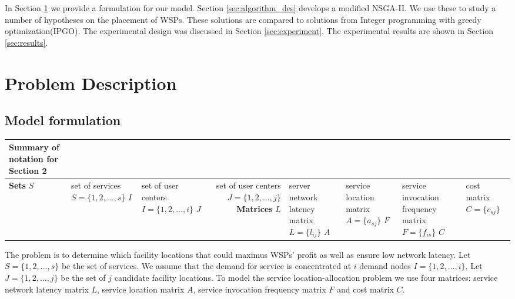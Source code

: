 \documentclass{llncs}
\begin{document}
In Section \ref{sec:problem} we provide a formulation for our model. Section \ref{sec:algorithm_des} develops a modified NSGA-II. 
We use these to study a number of hypotheses on the placement of WSPs. These solutions are compared to solutions from Integer
programming with greedy optimization(IPGO). 
The experimental design was discussed in Section \ref{sec:experiment}. The experimental results are shown in Section \ref{sec:results}.



\section{Problem Description}
\label{sec:problem}
\subsection{Model formulation}
\begin{tabular}{l*{2}{l}r}
	Summary of notation for Section 2              & & \\
	\hline
	\textbf{Sets} \cr
	$S$	& set of services $S = \{1, 2, ..., s\}$ \cr
	$I$	& set of user centers $I = \{1, 2, ..., i\}$ \cr
	$J$	& set of user centers $J = \{1, 2, ..., j\}$ \cr
	\textbf{Matrices} \cr
	$L$ & server network latency matrix $L = \{l_{ij}\}$ \cr
	$A$ & service location matrix $A = \{a_{sj}\}$ \cr
	$F$ & service invocation frequency matrix $F = \{f_{is}\}$ \cr
	$C$ & cost matrix $C = \{c_{sj}\}$ \cr
	\hline
\end{tabular}


The problem is to determine which facility locations that could maximus WSPs' profit 
as well as ensure low network latency. 
Let $S = \{ 1, 2, ..., s\}$ be the set of services. We assume that the demand for service is concentrated at $i$ 
demand nodes $I = \{ 1, 2, ..., i \}$. Let $J = \{ 1, 2, ..., j \}$ be the set of $j$ candidate facility locations.
To model the service location-allocation problem we use four matrices: service network latency matrix $L$, service location
matrix $A$, service invocation frequency matrix $F$ and cost matrix $C$.
\end{document}
